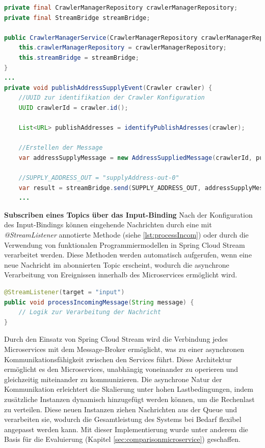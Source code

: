 \begin{lstlisting}[language=Java, caption=Beispiel einer Methode zur Verarbeitung ausgehender Nachrichten., label={lst:streambridge}]
private final CrawlerManagerRepository crawlerManagerRepository;
private final StreamBridge streamBridge;

public CrawlerManagerService(CrawlerManagerRepository crawlerManagerRepository, StreamBridge streamBridge) {
    this.crawlerManagerRepository = crawlerManagerRepository;
    this.streamBridge = streamBridge;
}
...
private void publishAddressSupplyEvent(Crawler crawler) {
    //UUID zur identifikation der Crawler Konfiguration
    UUID crawlerId = crawler.id();
    
    List<URL> publishAddresses = identifyPublishAdresses(crawler);

    //Erstellen der Message
    var addressSupplyMessage = new AddressSuppliedMessage(crawlerId, publishAddresses);

    //SUPPLY_ADDRESS_OUT = "supplyAddress-out-0"
    var result = streamBridge.send(SUPPLY_ADDRESS_OUT, addressSupplyMessage);
    ...
\end{lstlisting}
\textbf{Subscriben eines Topics über das Input-Binding}\newline
Nach der Konfiguration des Input-Bindings können eingehende Nachrichten durch eine mit \textit{@StreamListener} annotierte Methode (siehe \ref{lst:processIncom}) oder durch die Verwendung von funktionalen Programmiermodellen in Spring Cloud Stream verarbeitet werden. Diese Methoden werden automatisch aufgerufen, wenn eine neue Nachricht im abonnierten Topic erscheint, wodurch die asynchrone Verarbeitung von Ereignissen innerhalb des Microservices ermöglicht wird.
\newpage
\begin{lstlisting}[language=Java, caption=Beispiel einer Methode zur Verarbeitung eingehender Nachrichten., label={lst:processIncom}]
@StreamListener(target = "input")
public void processIncomingMessage(String message) {
    // Logik zur Verarbeitung der Nachricht
}
\end{lstlisting}


Durch den Einsatz von Spring Cloud Stream wird die Verbindung jedes Microservices mit dem Message-Broker ermöglicht, was zu einer  asynchronen Kommunikationsfähigkeit zwischen den Services führt. Diese Architektur ermöglicht es den Microservices, unabhängig voneinander zu operieren und gleichzeitig miteinander zu kommunizieren. Die asynchrone Natur der Kommunikation erleichtert die Skalierung unter hohen Lastbedingungen, indem zusätzliche Instanzen dynamisch hinzugefügt werden können, um die Rechenlast zu verteilen. Diese neuen Instanzen ziehen Nachrichten aus der Queue und verarbeiten sie, wodurch die Gesamtleistung des Systems bei Bedarf flexibel angepasst werden kann. Mit dieser Implementierung wurde unter anderem die Basis für die Evaluierung (Kapitel \ref{sec:comparisonmicroservice}) geschaffen.

